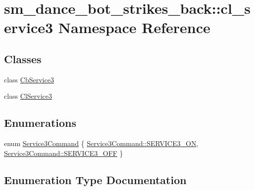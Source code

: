 \hypertarget{namespacesm__dance__bot__strikes__back_1_1cl__service3}{}\section{sm\+\_\+dance\+\_\+bot\+\_\+strikes\+\_\+back\+:\+:cl\+\_\+service3 Namespace Reference}
\label{namespacesm__dance__bot__strikes__back_1_1cl__service3}
\subsection*{Classes}
\begin{DoxyCompactItemize}
\item 
class \hyperlink{classsm__dance__bot__strikes__back_1_1cl__service3_1_1CbService3}{Cb\+Service3}
\item 
class \hyperlink{classsm__dance__bot__strikes__back_1_1cl__service3_1_1ClService3}{Cl\+Service3}
\end{DoxyCompactItemize}
\subsection*{Enumerations}
\begin{DoxyCompactItemize}
\item 
enum \hyperlink{namespacesm__dance__bot__strikes__back_1_1cl__service3_ac2ccf5d911840620cf8d0443c29d8b6b}{Service3\+Command} \{ \hyperlink{namespacesm__dance__bot__strikes__back_1_1cl__service3_ac2ccf5d911840620cf8d0443c29d8b6ba13cdca48a01bbb44fa8fb35567fbc58e}{Service3\+Command\+::\+S\+E\+R\+V\+I\+C\+E3\+\_\+\+ON}, 
\hyperlink{namespacesm__dance__bot__strikes__back_1_1cl__service3_ac2ccf5d911840620cf8d0443c29d8b6ba642ed22a7f6b816840289b4256116e9e}{Service3\+Command\+::\+S\+E\+R\+V\+I\+C\+E3\+\_\+\+O\+FF}
 \}
\end{DoxyCompactItemize}


\subsection{Enumeration Type Documentation}
\mbox{\label{namespacesm__dance__bot__strikes__back_1_1cl__service3_ac2ccf5d911840620cf8d0443c29d8b6b}} 
